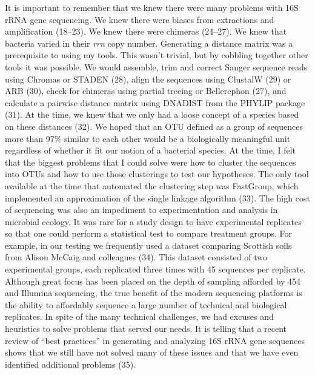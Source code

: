 \documentclass[11pt,]{article}
\begin{document}
It is important to remember that we knew there were many problems with
16S rRNA gene sequencing. We knew there were biases from extractions and
amplification (18--23). We knew there were chimeras (24--27). We knew
that bacteria varied in their \emph{rrn} copy number. Generating a
distance matrix was a prerequisite to using my tools. This wasn't
trivial, but by cobbling together other tools it was possible. We would
assemble, trim and correct Sanger sequence reads using Chromas or STADEN
(28), align the sequences using ClustalW (29) or ARB (30), check for
chimeras using partial treeing or Bellerephon (27), and calculate a
pairwise distance matrix using DNADIST from the PHYLIP package (31). At
the time, we knew that we only had a loose concept of a species based on
these distances (32). We hoped that an OTU defined as a group of
sequences more than 97\% similar to each other would be a biologically
meaningful unit regardless of whether it fit our notion of a bacterial
species. At the time, I felt that the biggest problems that I could
solve were how to cluster the sequences into OTUs and how to use those
clusterings to test our hypotheses. The only tool available at the time
that automated the clustering step was FastGroup, which implemented an
approximation of the single linkage algorithm (33). The high cost of
sequencing was also an impediment to experimentation and analysis in
microbial ecology. It was rare for a study design to have experimental
replicates so that one could perform a statistical test to compare
treatment groups. For example, in our testing we frequently used a
dataset comparing Scottish soils from Alison McCaig and colleagues (34).
This dataset consisted of two experimental groups, each replicated three
times with 45 sequences per replicate. Although great focus has been
placed on the depth of sampling afforded by 454 and Illumina sequencing,
the true benefit of the modern sequencing platforms is the ability to
affordably sequence a large number of technical and biological
replicates. In spite of the many technical challenges, we had excuses
and heuristics to solve problems that served our needs. It is telling
that a recent review of ``best practices'' in generating and analyzing
16S rRNA gene sequences shows that we still have not solved many of
these issues and that we have even identified additional problems (35).
\end{document}
